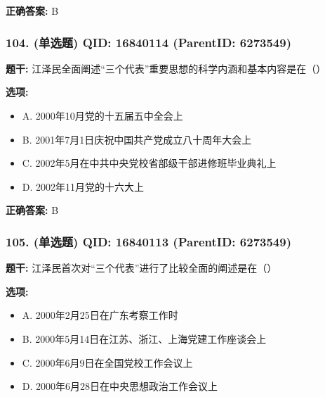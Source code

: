 \documentclass[12pt,UTF8]{ctexart}
\begin{document}
\textbf{正确答案:}
B

\vspace{0.3em}\hrulefill\vspace{0.7em}

\subsubsection*{104. (单选题) \small QID: 16840114 (ParentID: 6273549)}

\textbf{题干:}
江泽民全面阐述“三个代表”重要思想的科学内涵和基本内容是在（）



\textbf{选项:}
\begin{itemize}[leftmargin=*]

  \item A. 2000年10月党的十五届五中全会上

  \item B. 2001年7月1日庆祝中国共产党成立八十周年大会上

  \item C. 2002年5月在中共中央党校省部级干部进修班毕业典礼上

  \item D. 2002年11月党的十六大上

\end{itemize}

\textbf{正确答案:}
B

\vspace{0.3em}\hrulefill\vspace{0.7em}

\subsubsection*{105. (单选题) \small QID: 16840113 (ParentID: 6273549)}

\textbf{题干:}
江泽民首次对“三个代表”进行了比较全面的阐述是在（）



\textbf{选项:}
\begin{itemize}[leftmargin=*]

  \item A. 2000年2月25日在广东考察工作时

  \item B. 2000年5月14日在江苏、浙江、上海党建工作座谈会上

  \item C. 2000年6月9日在全国党校工作会议上

  \item D. 2000年6月28日在中央思想政治工作会议上

\end{itemize}
\end{document}
